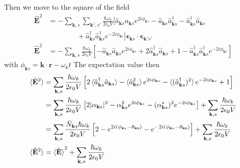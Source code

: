 \documentclass[../../../main.tex]{subfiles}
\begin{document}
Then we move to the square of the field
\begin{align*}
  \hat{\mathbf{E}}^2
   & =  - \sum_{\mathbf{k},s} \sum_{\mathbf{k}',s'} \frac{\hbar \omega_k}{2 \epsilon_0 V}
  \bigg[ \hat{a}_{\mathbf{k }s} \hat{a}_{\mathbf{k }s}  e ^{2i\phi_{\mathbf{k }s}} -\hat{a}_{\mathbf{k }s} \hat{a}^\dagger_{\mathbf{k }s} -\hat{a}^\dagger_{\mathbf{k }s} \hat{a}_{\mathbf{k }s} \\
   & \qquad\qquad+\hat{a}^\dagger_{\mathbf{k }s} \hat{a}^\dagger_{\mathbf{k }s} e ^{-2i\phi_{\mathbf{k }s}} \bigg]
  \boldsymbol{\epsilon}_{\mathbf{k}s} \cdot \boldsymbol{\epsilon}_{\mathbf{k}'s'}                                                                                                                \\
  \hat{\mathbf{E}}^2
   & =  - \sum_{\mathbf{k},s} \frac{\hbar \omega_k}{2 \epsilon_0 V}
  \left[ -\hat{a}_{\mathbf{k }s} \hat{a}_{\mathbf{k }s}  e ^{2i\phi_{\mathbf{k }s}}+ 2 \hat{a}^\dagger_{\mathbf{k }s} \hat{a}_{\mathbf{k }s} +1 -\hat{a}^\dagger_{\mathbf{k }s} \hat{a}^\dagger_{\mathbf{k }s} e ^{-2i\phi_{\mathbf{k }s}} \right]
\end{align*}
with $\phi_{\mathbf{k }s}=\mathbf{k }\cdot \mathbf{r }-\omega_kt$
The expectation value then
\begin{align*}
  \braket{  \hat{\mathbf{E}}^2 }
   & = \sum_{\mathbf{k},s} \frac{\hbar \omega_k}{2 \epsilon_0 V}
  \left[2\braket{ \hat{a}^\dagger_{\mathbf{k }s} \hat{a}_{\mathbf{k }s} } -\braket{\hat{a}_{\mathbf{k }s} ^2}  e ^{2i\phi_{\mathbf{k }s}}   - \braket{(\hat{a}^\dagger_{\mathbf{k }s} )^2} e ^{-2i\phi_{\mathbf{k }s}} +1 \right] \\
   & = \sum_{\mathbf{k},s} \frac{\hbar \omega_k}{2 \epsilon_0 V}
  \left[ 2|\alpha_{\mathbf{k }s}|^2 -\alpha_{\mathbf{k }s}^2e ^{2i\phi_{\mathbf{k }s}} - (\alpha_{\mathbf{k }s }^*)^2e ^{-2i\phi_{\mathbf{k }s}}\right] + \sum_{\mathbf{k },s}\frac{\hbar \omega_k }{2\epsilon_0 V}               \\
   & = \sum_{\mathbf{k},s} \frac{\bar{N}_{\mathbf{k }s}\hbar \omega_k}{2 \epsilon_0 V}
  \left[ 2 -e ^{2i(\phi_{\mathbf{k }s}-\theta_{\mathbf{ks}})} - e^{-2i (\phi_{\mathbf{k }s}-\theta_{\mathbf{ks}})}\right] + \sum_{\mathbf{k },s}\frac{\hbar \omega_k }{2\epsilon_0 V}                                             \\
  \braket{  \hat{\mathbf{E}}^2 }
   & = \braket{\hat{\mathbf{E}} }^2+\sum_{\mathbf{k },s}\frac{\hbar \omega_k }{2\epsilon_0 V}
\end{align*}
\end{document}
